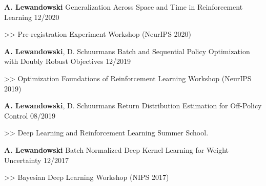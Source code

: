 \begin{cventries}
    \cventry
    { \textbf{A. Lewandowski}}
    {Generalization Across Space and Time in Reinforcement Learning}
    {12/2020}
    {
      \begin{cvitems}
    	\item[>>] Pre-registration Experiment Workshop (NeurIPS 2020)
      \end{cvitems}
    }

    \cventry
    { \textbf{A. Lewandowski}, D. Schuurmans}
    {Batch and Sequential Policy Optimization with Doubly Robust Objectives}
    {12/2019}
    {
      \begin{cvitems}
    	\item[>>] Optimization Foundations of Reinforcement Learning Workshop (NeurIPS 2019)
      \end{cvitems}
    }

    \cventry
    { \textbf{A. Lewandowski}, D. Schuurmans}
    {Return Distribution Estimation for Off-Policy Control}
    {08/2019}
    {
      \begin{cvitems}
    	\item[>>] Deep Learning and Reinforcement Learning Summer School.
      \end{cvitems}
    }

  \cventry
    {\textbf{A. Lewandowski}}
    {Batch Normalized Deep Kernel Learning for Weight Uncertainty}
    {12/2017}
    {
      \begin{cvitems}
    	\item[>>] Bayesian Deep Learning Workshop (NIPS 2017)
      \end{cvitems}
    }
  \end{cventries}

% 
% 

